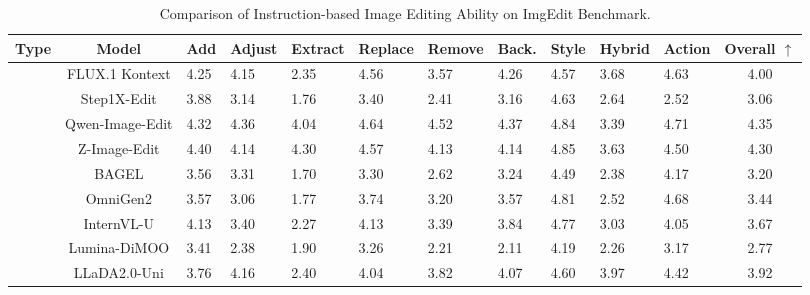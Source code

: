\begin{table}[!tb]
\centering
\renewcommand{\arraystretch}{1.2}
\setlength\tabcolsep{1.5pt}
\footnotesize %
\caption{Comparison of Instruction-based Image Editing Ability on ImgEdit Benchmark.}
\begin{tabularx}{\linewidth}{cc| *{9}{C} |c} 
\toprule
\textbf{Type} & \textbf{Model} & \textbf{Add} & \textbf{Adjust} &\textbf{Extract} &\textbf{Replace} &\textbf{Remove} &\textbf{Back.} &\textbf{Style} &\textbf{Hybrid} &\textbf{Action}
&\textbf{Overall $\uparrow$} \\
\midrule
{} 
& FLUX.1 Kontext & 4.25 & 4.15 & 2.35 & 4.56 & 3.57 & 4.26 & 4.57 & 3.68 & 4.63 & 4.00 \\
& Step1X-Edit &3.88 &3.14 &1.76 &3.40 &2.41 &3.16 &4.63 &2.64 &2.52 &3.06 \\
& Qwen-Image-Edit &4.32 &4.36 &4.04 &4.64 &4.52 &4.37 &4.84 &3.39 &4.71 &4.35 \\
& Z-Image-Edit &4.40 &4.14 &4.30 &4.57 &4.13 &4.14 &4.85 &3.63 &4.50 &4.30 \\

\midrule
{} 
& BAGEL & 3.56 & 3.31 & 1.70 & 3.30 & 2.62 & 3.24 & 4.49 & 2.38 & 4.17 & 3.20 \\
& OmniGen2 & 3.57 & 3.06 & 1.77 & 3.74 & 3.20 & 3.57 & 4.81 & 2.52 & 4.68 & 3.44 \\
& InternVL-U &4.13 &3.40 &2.27 &4.13 &3.39 &3.84 &4.77 &3.03 &4.05 &3.67\\
& Lumina-DiMOO &3.41 &2.38 &1.90 &3.26 &2.21 &2.11 &4.19 &2.26 &3.17 &2.77\\
& LLaDA2.0-Uni &3.76 &4.16 &2.40 & 4.04 & 3.82 & 4.07 & 4.60 & 3.97 & 4.42 & 3.92 \\
\bottomrule
\end{tabularx}
\label{table:imgedit_results}
\vspace{-0.15in}
\end{table}